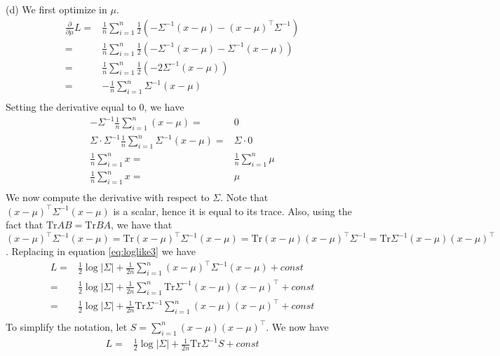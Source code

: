 \documentclass[12pt]{article}
\newcommand{\tr}{\mathrm{Tr}}
\begin{document}
(d) We first optimize in $\mu$. 
\begin{equation}
\begin{split}
   \frac{\partial}{\partial \mu} L
=& \frac{1}{n} \sum_{i=1}^{n} \frac{1}{2}\left(-\Sigma^{-1}(x-\mu)- (x-\mu)^\top \Sigma^{-1} \right)\\
=& \frac{1}{n} \sum_{i=1}^{n} \frac{1}{2}\left(-\Sigma^{-1}(x-\mu)- \Sigma^{-1}(x-\mu) \right)\\
=& \frac{1}{n} \sum_{i=1}^{n} \frac{1}{2}\left(-2\Sigma^{-1}(x-\mu) \right)\\
=& -\frac{1}{n} \sum_{i=1}^{n}\Sigma^{-1}(x-\mu) \\
\end{split}
\end{equation}
Setting the derivative equal to 0, we have
\begin{equation}
\begin{split}
 -\Sigma^{-1}\frac{1}{n} \sum_{i=1}^{n}(x-\mu)=&0 \\
\Sigma\cdot \Sigma^{-1}\frac{1}{n} \sum_{i=1}^{n}\Sigma^{-1}(x-\mu)=&\Sigma \cdot 0 \\
\frac{1}{n} \sum_{i=1}^{n}x=& \frac{1}{n} \sum_{i=1}^{n}\mu \\
\frac{1}{n} \sum_{i=1}^{n}x=& \mu \\
\end{split}
\end{equation}
We now compute the derivative with respect to $\Sigma$. Note that $(x-\mu)^\top\Sigma^{-1}(x-\mu)$ is a scalar, hence it is equal to its trace. Also, using the fact that $\tr AB = \tr BA$, we have that  $(x-\mu)^\top\Sigma^{-1}(x-\mu)=\tr (x-\mu)^\top\Sigma^{-1}(x-\mu)=\tr (x-\mu)(x-\mu)^\top\Sigma^{-1}=\tr \Sigma^{-1}(x-\mu)(x-\mu)^\top$. Replacing in equation \ref{eq:loglike3} we have
\begin{equation}
\begin{split}
    L 
=& \frac{1}{2}\log|\Sigma| + \frac{1}{2n}\sum_{i=1}^n(x-\mu)^\top\Sigma^{-1}(x-\mu) + const\\
=& \frac{1}{2}\log|\Sigma| + \frac{1}{2n}\sum_{i=1}^n\tr \Sigma^{-1}(x-\mu)(x-\mu)^\top + const\\
=& \frac{1}{2}\log|\Sigma| + \frac{1}{2n}\tr\Sigma^{-1}\sum_{i=1}^n(x-\mu)(x-\mu)^\top + const\\
\end{split}
\label{eq:loglike4}
\end{equation}
To simplify the notation, let $S=\sum_{i=1}^n(x-\mu)(x-\mu)^\top$. We now have
\begin{equation}
\begin{split}
    L 
=& \frac{1}{2}\log|\Sigma| + \frac{1}{2n}\tr\Sigma^{-1}S + const\\
\end{split}
\label{eq:loglike5}
\end{equation}
\end{document}
